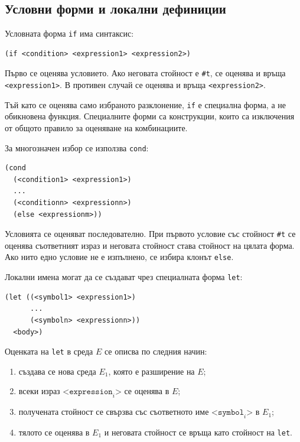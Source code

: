 \subsection{Условни форми и локални дефиниции}\label{s:19.1.4}

Условната форма \texttt{if} има синтаксис:

\begin{verbatim}
(if <condition> <expression1> <expression2>)
\end{verbatim}

Първо се оценява условието. Ако неговата стойност е \texttt{\#t}, се оценява и връща \texttt{<expression1>}. В противен случай се оценява и връща \texttt{<expression2>}.

Тъй като се оценява само избраното разклонение, \texttt{if} е специална форма, а не обикновена функция. Специалните форми са конструкции, които са изключения от общото правило за оценяване на комбинациите.

За многозначен избор се използва \texttt{cond}:

\begin{verbatim}
(cond
  (<condition1> <expression1>)
  ...
  (<conditionn> <expressionn>)
  (else <expressionm>))
\end{verbatim}

Условията се оценяват последователно. При първото условие със стойност \texttt{\#t} се оценява съответният израз и неговата стойност става стойност на цялата форма. Ако нито едно условие не е изпълнено, се избира клонът \texttt{else}.

Локални имена могат да се създават чрез специалната форма \texttt{let}:

\begin{verbatim}
(let ((<symbol1> <expression1>)
      ...
      (<symboln> <expressionn>))
  <body>)
\end{verbatim}

Оценката на \texttt{let} в среда $E$ се описва по следния начин:

\begin{enumerate}
    \item създава се нова среда $E_1$, която е разширение на $E$;
    \item всеки израз $\texttt{<expression}_i\texttt{>}$ се оценява в $E$;
    \item получената стойност се свързва със съответното име $\texttt{<symbol}_i\texttt{>}$ в $E_1$;
    \item тялото се оценява в $E_1$ и неговата стойност се връща като стойност на \texttt{let}.
\end{enumerate}

